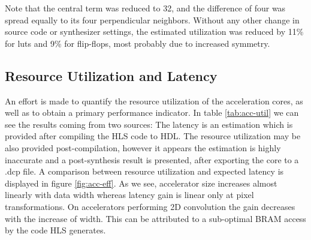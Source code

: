 Note that the central term was reduced to 32, and the difference of four was spread equally
to its four perpendicular neighbors. Without any other change in source code or
synthesizer settings, the estimated utilization was reduced by 11\% for \glspl{lut}
and 9\% for flip-flops, most probably due to increased symmetry.

\subsection{Resource Utilization and Latency}

An effort is made to quantify the resource utilization of the acceleration cores,
as well as to obtain a primary performance indicator. In table \ref{tab:acc-util}
we can see the results coming from two sources: The latency is an estimation
which is provided after compiling the HLS code to HDL. The resource utilization
may be also provided post-compilation, however it appears the estimation
is highly inaccurate and a post-synthesis result is presented, after exporting the core
to a .dcp file. A comparison between resource utilization and expected latency
is displayed in figure \ref{fig:acc-eff}. As we see, accelerator size increases
almost linearly with data width whereas latency gain is linear only at pixel transformations.
On accelerators performing 2D convolution the gain decreases with the increase of width.
This can be attributed to a sub-optimal BRAM access by the code HLS generates.

